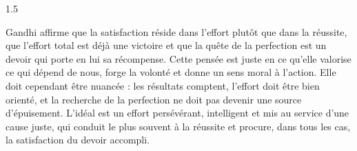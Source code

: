 \documentclass[12pt]{article}
\begin{document}
\begin{spacing}{1.5}

Gandhi affirme que la satisfaction réside dans l'effort plutôt que dans la réussite, que l'effort total est déjà une victoire et que la quête de la perfection est un devoir qui porte en lui sa récompense. Cette pensée est juste en ce qu'elle valorise ce qui dépend de nous, forge la volonté et donne un sens moral à l'action. Elle doit cependant être nuancée : les résultats comptent, l'effort doit être bien orienté, et la recherche de la perfection ne doit pas devenir une source d'épuisement. L'idéal est un effort persévérant, intelligent et mis au service d'une cause juste, qui conduit le plus souvent à la réussite et procure, dans tous les cas, la satisfaction du devoir accompli.

\end{spacing}
\end{document}
